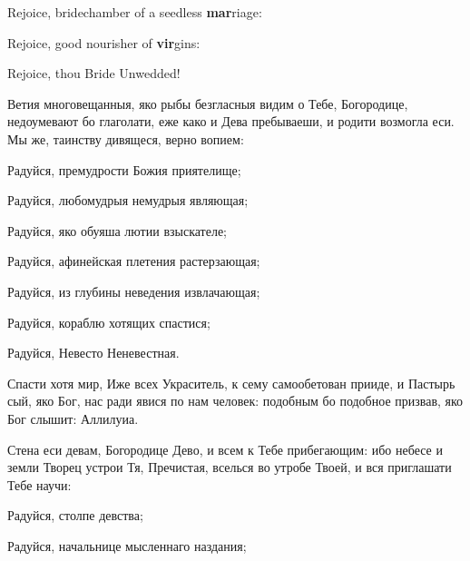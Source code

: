Rejoice, bridechamber of a seedless \textbf{mar}riage:


Rejoice, good nourisher of \textbf{vir}gins:


Rejoice, thou Bride Unwedded!

\pagebreak


\Ierei Ветия многовещанныя, яко рыбы безгласныя видим о Тебе, Богородице, недоумевают бо глаголати, еже како и Дева пребываеши, и родити возмогла еси. Мы же, таинству дивящеся, верно вопием:

Радуйся, премудрости Божия приятелище;


Радуйся, любомудрыя немудрыя являющая;


Радуйся, яко обуяша лютии взыскателе;


Радуйся, афинейская плетения растерзающая;


Радуйся, из глубины неведения извлачающая;


Радуйся, кораблю хотящих спастися;


Радуйся, Невесто Неневестная.


\Ierei Спасти хотя мир, Иже всех Украситель, к сему самообетован прииде, и Пастырь сый, яко Бог, нас ради явися по нам человек: подобным бо подобное призвав, яко Бог слышит: Аллилуиа.


\Ierei Стена еси девам, Богородице Дево, и всем к Тебе прибегающим: ибо небесе и земли Творец устрои Тя, Пречистая, вселься во утробе Твоей, и вся приглашати Тебе научи:

Радуйся, столпе девства;


Радуйся, начальнице мысленнаго наздания;

